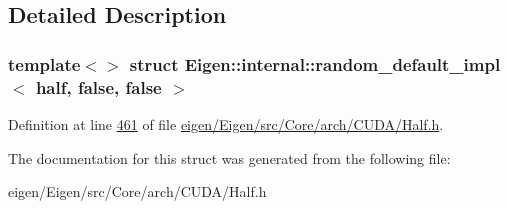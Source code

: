 \subsection{Detailed Description}
\subsubsection*{template$<$$>$\newline
struct Eigen\+::internal\+::random\+\_\+default\+\_\+impl$<$ half, false, false $>$}



Definition at line \hyperlink{eigen_2_eigen_2src_2_core_2arch_2_c_u_d_a_2_half_8h_source_l00461}{461} of file \hyperlink{eigen_2_eigen_2src_2_core_2arch_2_c_u_d_a_2_half_8h_source}{eigen/\+Eigen/src/\+Core/arch/\+C\+U\+D\+A/\+Half.\+h}.



The documentation for this struct was generated from the following file\+:\begin{DoxyCompactItemize}
\item 
eigen/\+Eigen/src/\+Core/arch/\+C\+U\+D\+A/\+Half.\+h\end{DoxyCompactItemize}
